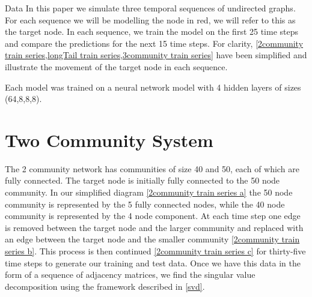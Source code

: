 \documentclass[12pt]{amsbook}
\begin{document}
\begin{chapter}{Data}
    In this paper we simulate three temporal sequences of undirected graphs. For each sequence we will be modelling the node in red, we will refer to this as the target node. In each sequence, we train the model on the first 25 time steps and compare the predictions for the next 15 time steps. For clarity, \cref{2community train series,longTail train series,3community train series} have been simplified and illustrate the movement of the target node in each sequence. 
    
    Each model was trained on a neural network model with 4 hidden layers of sizes (64,8,8,8).

    \section{Two Community System}
        The 2 community network has communities of size 40 and 50, each of which are fully connected. The target node is initially fully connected to the 50 node community. In our simplified diagram \cref{2community train series a} the 50 node community is represented by the 5 fully connected nodes, while the 40 node community is represented by the 4 node component. At each time step one edge is removed between the target node and the larger community and replaced with an edge between the target node and the smaller community \cref{2community train series b}. This process is then continued \cref{2community train series c} for thirty-five time steps to generate our training and test data. Once we have this data in the form of a sequence of adjacency matrices, we find the singular value decomposition using the framework described in \cref{svd}.


\end{chapter}
\end{document}
